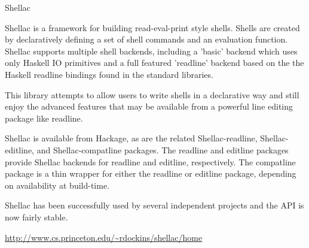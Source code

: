 \documentclass{article}
\begin{document}
\begin{hcarentry}{Shellac}
\makeheader

Shellac is a framework for building read-eval-print style shells.  
Shells are created by declaratively defining a set of shell commands
and an evaluation function.  Shellac supports multiple shell backends,
including a 'basic' backend which uses only Haskell IO primitives and
a full featured 'readline' backend based on the the Haskell readline
bindings found in the standard libraries.

This library attempts to allow users to write shells in a declarative
way and still enjoy the advanced features that may be available from a
powerful line editing package like readline.

Shellac is available from Hackage, as are the related
Shellac-readline, Shellac-editline, and Shellac-compatline
packages.  The readline and editline packages provide
Shellac backends for readline and editline, respectively.
The compatline package is a thin wrapper for either the
readline or editline package, depending on availability
at build-time.

Shellac has been successfully used by several independent projects
and the API is now fairly stable.

\FurtherReading
\url{http://www.cs.princeton.edu/~rdockins/shellac/home}
\end{hcarentry}
\end{document}
